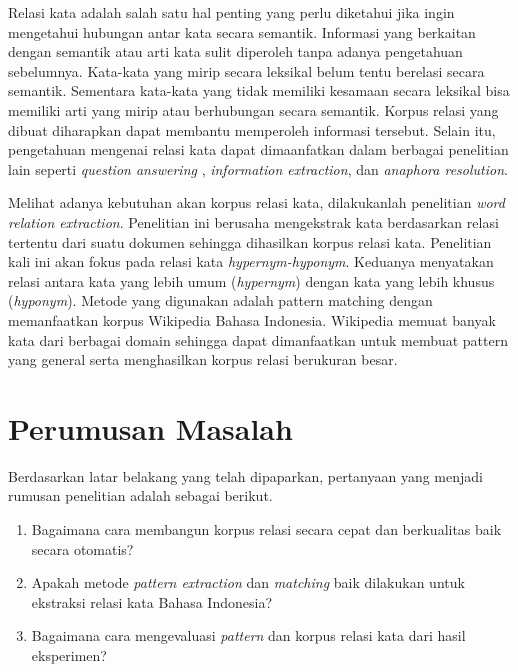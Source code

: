 Relasi kata adalah salah satu hal penting yang perlu diketahui jika ingin mengetahui hubungan antar kata secara semantik. Informasi yang berkaitan dengan semantik atau arti kata sulit diperoleh tanpa adanya pengetahuan sebelumnya. Kata-kata yang mirip secara leksikal belum tentu berelasi secara semantik. Sementara kata-kata yang tidak memiliki kesamaan secara leksikal bisa memiliki arti yang mirip atau berhubungan secara semantik. Korpus relasi yang dibuat diharapkan dapat membantu memperoleh informasi tersebut. Selain itu, pengetahuan mengenai relasi kata dapat dimaanfatkan dalam berbagai penelitian lain seperti \textit{question answering} \citep{paper.ravichandran&hovy}, \textit{information extraction}, dan \textit{anaphora resolution}.

Melihat adanya kebutuhan akan korpus relasi kata, dilakukanlah penelitian \textit{word relation extraction}. Penelitian ini berusaha mengekstrak kata berdasarkan relasi tertentu dari suatu dokumen sehingga dihasilkan korpus relasi kata. Penelitian kali ini akan fokus pada relasi kata \textit{hypernym-hyponym}. Keduanya menyatakan relasi antara kata yang lebih umum (\textit{hypernym}) dengan kata yang lebih khusus (\textit{hyponym}). Metode yang digunakan adalah pattern matching dengan memanfaatkan korpus Wikipedia Bahasa Indonesia. Wikipedia memuat banyak kata dari berbagai domain sehingga dapat dimanfaatkan untuk membuat pattern yang general serta menghasilkan korpus relasi berukuran besar.

\section{Perumusan Masalah}
Berdasarkan latar belakang yang telah dipaparkan, pertanyaan yang menjadi rumusan penelitian adalah sebagai berikut.
\begin{enumerate}
	\item Bagaimana cara membangun korpus relasi secara cepat dan berkualitas baik secara otomatis?
	\item Apakah metode \textit{pattern extraction} dan \textit{matching} baik dilakukan untuk ekstraksi relasi kata Bahasa Indonesia?
	\item Bagaimana cara mengevaluasi \textit{pattern} dan korpus relasi kata dari hasil eksperimen?
\end{enumerate}


